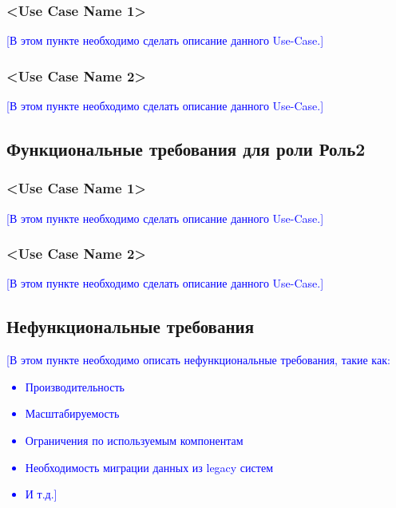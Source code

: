 \documentclass[pdftex,12pt,a4paper]{report}
\providecommand{\comment}[1]{\textcolor{blue}{#1}}
\begin{document}
\subsubsection{<Use Case Name 1>}
\comment{[В этом пункте необходимо сделать описание данного Use-Case.]}

\subsubsection{<Use Case Name 2>}
\comment{[В этом пункте необходимо сделать описание данного Use-Case.]}

\subsection{Функциональные требования для роли Роль2}

\subsubsection{<Use Case Name 1>}
\comment{[В этом пункте необходимо сделать описание данного Use-Case.]}

\subsubsection{<Use Case Name 2>}
\comment{[В этом пункте необходимо сделать описание данного Use-Case.]}

\subsection{Нефункциональные требования}
\comment{[В этом пункте необходимо описать нефункциональные требования, такие как:
\begin{itemize}
\item Производительность
\item Масштабируемость
\item Ограничения по используемым компонентам
\item Необходимость миграции данных из legacy систем
\item И т.д.]
\end{itemize}}
\end{document}
